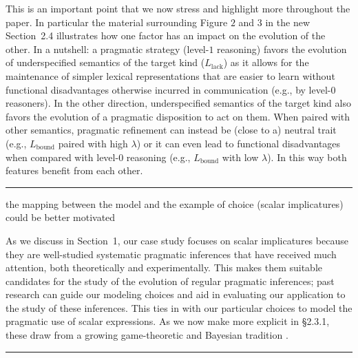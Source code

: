 \documentclass[12pt,a4paper]{article}
\begin{document}
This is an important point that we now stress and highlight more throughout the paper. In particular the material surrounding Figure $2$ and $3$ in the new Section~2.4 illustrates how one factor has an impact on the evolution of the other. In a nutshell: a pragmatic strategy (level-$1$ reasoning) favors the evolution of underspecified semantics of the target kind ($L_{\text{lack}}$) as it allows for the maintenance of simpler lexical representations that are easier to learn without functional disadvantages otherwise incurred in communication (e.g., by level-$0$ reasoners). In the other direction, underspecified semantics of the target kind also favors the evolution of a pragmatic disposition to act on them. When paired with other semantics, pragmatic refinement can instead be (close to a) neutral trait (e.g., $L_{\text{bound}}$ paired with high $\lambda$) or it can even lead to  functional disadvantages when compared with level-$0$ reasoning (e.g., $L_{\text{bound}}$ with low $\lambda$). In this way both features benefit from each other.

%

\vspace{.75cm}
\noindent\rule{\textwidth}{1pt}

\begin{mdframed}[backgroundcolor=gray!25,linecolor=gray!25,frametitle= Reviewer \thereviewerCounter~comment \thereviewerCommentCounter \hfill ~~({\it modeling choices})]
the mapping between the model and the example of choice (scalar implicatures) could be better motivated
\end{mdframed}

As we discuss in Section~1, our case study focuses on scalar implicatures because they are well-studied systematic pragmatic inferences that have received much attention, both theoretically and experimentally. This makes them suitable candidates for the study of the evolution of regular pragmatic inferences; past research can guide our modeling choices and aid in evaluating our application to the study of these inferences. This ties in with our particular choices to model the pragmatic use of scalar expressions. As we now make more explicit in \S 2.3.1, these draw from a growing game-theoretic and Bayesian tradition \citep[e.g.,][]{franke:2009,FrankeJager2015:Probabilistic-p,GoodmanFrank2016:Pragmatic-Langu}. 

%
\vspace{.75cm}
\noindent\rule{\textwidth}{1pt}
\vspace{.1cm}
\end{document}

